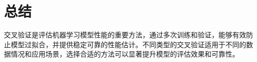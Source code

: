\documentclass{article}
\begin{document}
\section{总结}
交叉验证是评估机器学习模型性能的重要方法，通过多次训练和验证，能够有效防止模型过拟合，并提供稳定可靠的性能估计。不同类型的交叉验证适用于不同的数据情况和应用场景，选择合适的方法可以显著提升模型的评估效果和可靠性。
\end{document}
